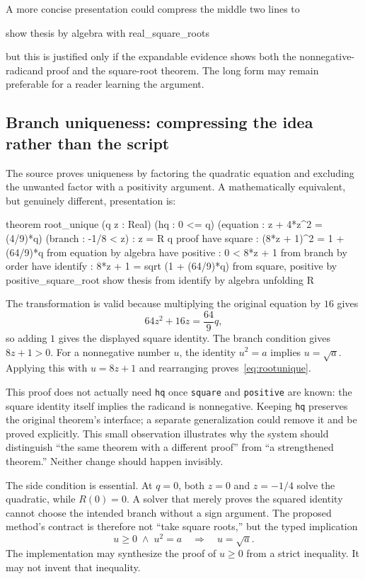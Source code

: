 \documentclass[11pt,a4paper]{article}
\theoremstyle{remark}
\newcommand{\ty}[1]{\texttt{#1}}
\begin{document}
A more concise presentation could compress the middle two lines to
\Needspace{34pt}
\begin{code}
show thesis by algebra with real_square_roots
\end{code}
but this is justified only if the expandable evidence shows both the nonnegative-radicand proof and the square-root theorem. The long form may remain preferable for a reader learning the argument.

\subsection{Branch uniqueness: compressing the idea rather than the script}
The source proves uniqueness by factoring the quadratic equation and excluding the unwanted factor with a positivity argument.\cite{proveit-root} A mathematically equivalent, but genuinely different, presentation is:
\Needspace{154pt}
\begin{code}
theorem root_unique (q z : Real)
  (hq : 0 <= q)
  (equation : z + 4*z^2 = (4/9)*q)
  (branch : -1/8 < z) : z = R q
proof
  have square : (8*z + 1)^2 = 1 + (64/9)*q
    from equation by algebra
  have positive : 0 < 8*z + 1 from branch by order
  have identify : 8*z + 1 = sqrt (1 + (64/9)*q)
    from square, positive by positive_square_root
  show thesis from identify by algebra unfolding R
\end{code}
The transformation is valid because multiplying the original equation by $16$ gives
\[
64z^2+16z=\frac{64}{9}q,
\]
so adding $1$ gives the displayed square identity. The branch condition gives $8z+1>0$. For a nonnegative number $u$, the identity $u^2=a$ implies $u=\sqrt a$. Applying this with $u=8z+1$ and rearranging proves~\eqref{eq:rootunique}.

This proof does not actually need \ty{hq} once \ty{square} and \ty{positive} are known: the square identity itself implies the radicand is nonnegative. Keeping \ty{hq} preserves the original theorem's interface; a separate generalization could remove it and be proved explicitly. This small observation illustrates why the system should distinguish ``the same theorem with a different proof'' from ``a strengthened theorem.'' Neither change should happen invisibly.

The side condition is essential. At $q=0$, both $z=0$ and $z=-1/4$ solve the quadratic, while $R(0)=0$. A solver that merely proves the squared identity cannot choose the intended branch without a sign argument. The proposed method's contract is therefore not ``take square roots,'' but the typed implication
\begin{equation}\label{eq:positiveroot}
 u\geq0\;\land\;u^2=a\quad\Longrightarrow\quad u=\sqrt a.
\end{equation}
The implementation may synthesize the proof of $u\geq0$ from a strict inequality. It may not invent that inequality.
\end{document}
